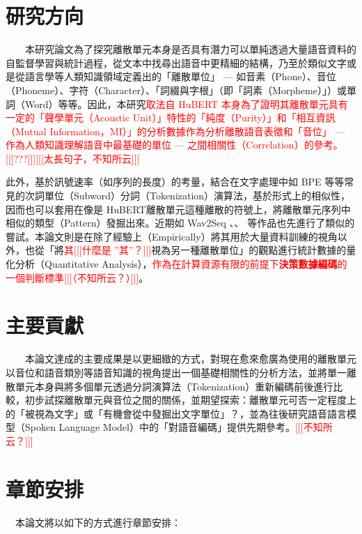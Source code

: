 \section{研究方向}

　　本研究論文為了探究離散單元本身是否具有潛力可以單純透過大量語音資料的自監督學習與統計過程，從文本中找尋出語音中更精細的結構，乃至於類似文字或是從語言學等人類知識領域定義出的「離散單位」 --- 如音素（Phone）、音位（Phoneme）、字符（Character）、「詞綴與字根」（即「詞素（Morpheme）」）或單詞（Word）等等。因此，本研究\textcolor{red}{取法自 HuBERT 本身為了證明其離散單元具有一定的「聲學單元（Acoustic Unit）」特性的「純度（Purity）」和「相互資訊（Mutual Information，MI）」的分析數據作為分析離散語音表徵和「音位」 --- 作為人類知識理解語音中最基礎的單位 --- 之間相關性（Correlation）的參考。[[[???]]][[[太長句子，不知所云]]]}

        此外，基於訊號速率（如序列的長度）的考量，結合在文字處理中如 BPE 等等常見的次詞單位（Subword）分詞（Tokenization）演算法，基於形式上的相似性，因而也可以套用在像是 HuBERT離散單元這種離散的符號上，將離散單元序列中相似的類型（Pattern）發掘出來。近期如 Wav2Seq \cite{wu_wav2seq_2023}、\cite{ren_speech_2022}、\cite{chang_exploring_2024} 等作品也先進行了類似的嘗試。本論文則是在除了經驗上（Empirically）將其用於大量資料訓練的視角以外，也從「將\textcolor{red}{其[[[什麼是 ''其''？]]]}視為另一種離散單位」的觀點進行統計數據的量化分析（Quantitative Analysis），\textcolor{red}{作為在計算資源有限的前提下\textbf{決策數據編碼}的一個判斷標準[[[（不知所云？）]]]}。

\section{主要貢獻}

　　本論文達成的主要成果是以更細緻的方式，對現在愈來愈廣為使用的離散單元以音位和語音類別等語音知識的視角提出一個基礎相關性的分析方法，並將單一離散單元本身與將多個單元透過分詞演算法（Tokenization）重新編碼前後進行比較，初步試探離散單元與音位之間的關係，並期望探索：離散單元可否一定程度上的「被視為文字」或「有機會從中發掘出文字單位」？，並為往後研究語音語言模型（Spoken Language Model）中的「對語音編碼」提供先期參考。\textcolor{red}{[[[不知所云？]]]}

\section{章節安排}

　本論文將以如下的方式進行章節安排：

